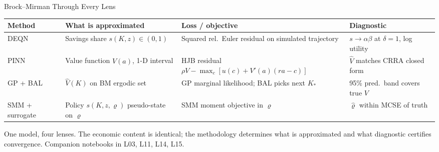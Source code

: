 \documentclass[aspectratio=169,11pt]{beamer}
\begin{document}
\begin{frame}{Brock--Mirman Through Every Lens}
\scriptsize
\begin{center}
\begin{tabular}{p{}p{}p{}p{}}
\toprule
\textbf{Method} & \textbf{What is approximated} & \textbf{Loss / objective} & \textbf{Diagnostic} \\
\midrule
DEQN              & Savings share $s(K,z)\in(0,1)$              & Squared rel.\ Euler residual on simulated trajectory & $s\to\alpha\beta$ at $\delta=1$, log utility \\
PINN              & Value function $\hat V(a)$, 1-D interval     & HJB residual $\rho V-\max_c[u(c)+V'(a)(ra-c)]$ & $\hat V$ matches CRRA closed form \\
GP + BAL          & $\hat V(K)$ on BM ergodic set                & GP marginal likelihood; BAL picks next $K_*$ & 95\% pred.\ band covers true $V$ \\
SMM + surrogate   & Policy $s(K,z,\varrho)$ pseudo-state on $\varrho$ & SMM moment objective in $\varrho$ & $\hat\varrho$ within MCSE of truth \\
\bottomrule
\end{tabular}
\end{center}

\vspace{0.15cm}
\footnotesize
One model, four lenses. The economic content is identical; the methodology determines what is approximated and what diagnostic certifies convergence.  Companion notebooks in L03, L11, L14, L15.
\end{frame}
\end{document}
